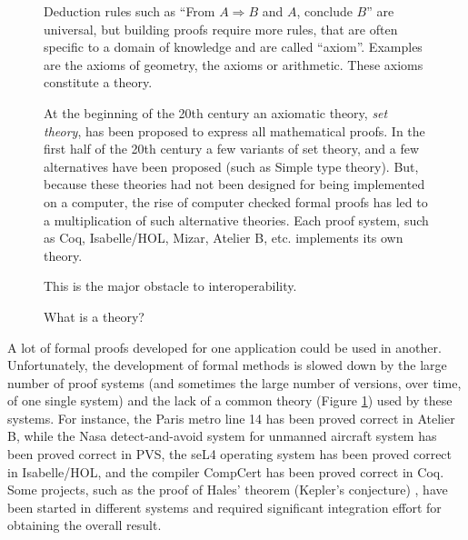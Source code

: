 \begin{figure}
\begin{framed}
Deduction rules such as ``From $A \Rightarrow B$ and $A$, conclude
$B$'' are universal, but building proofs require more rules, that are
often specific to a domain of knowledge and are called
``axiom''. Examples are the axioms of geometry, the axioms or
arithmetic. These axioms constitute a theory.

At the beginning of the 20th century an axiomatic theory, {\em set
  theory}, has been proposed to express all mathematical proofs. In
the first half of the 20th century a few variants of set theory, and a
few alternatives have been proposed (such as Simple type theory).
But, because these theories had not been designed for being
implemented on a computer, the rise of computer checked formal proofs
has led to a multiplication of such alternative theories. Each proof system,
such as {\sf Coq}, {\sf Isabelle/HOL}, {\sf Mizar}, {\sf Atelier B},
etc. implements its own theory.

This is the major obstacle to interoperability.
\caption{What is a theory?\label{theory}}
\end{framed}
\end{figure}

A lot of formal proofs developed for one application could be used in
another.  Unfortunately, the development of formal methods is slowed
down by the large number of proof systems (and sometimes the large
number of versions, over time, of one single system) and the lack of a
common theory (Figure \ref{theory}) used by these systems.  For
instance, the Paris metro line 14 has been proved correct in {\sf
  Atelier B}, while the Nasa detect-and-avoid system for unmanned
aircraft system has been proved correct in {\sf PVS}, the {\sf seL4}
operating system has been proved correct in {\sf Isabelle/HOL}, and
the compiler {\sf CompCert} has been proved correct in {\sf Coq}.
Some projects, such as the proof of Hales' theorem (Kepler's
conjecture) \cite{Hales17}, have been started in different systems and
required significant integration effort for obtaining the overall
result.

